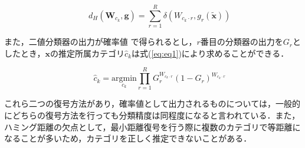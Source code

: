 \begin{description}
\begin{equation}
\label{eq:eq20}
 \hspace{20pt}d_H(\bm{W}_{c_k},\bm{g}) =\sum_{r=1}^R{\delta(W_{c_k\cdot r} , g_r(\tilde{\bm{x}}))}
\end{equation}\par


また，二値分類器の出力が確率値\cite{rvm} で得られるとし，$r$番目の分類器の出力を$G_r$としたとき，$\bm{x}$の推定所属カテゴリ$\hat{c}_k$は式(\ref{eq:eq1})により求めることができる．

\begin{equation}
\label{eq:eq1}
 \hspace{20pt} \hat{c}_k = \underset{{c_k}}{\text{argmin}} \prod_{r=1}^R G_r^{W_{c_k\cdot r}} (1 - G_r)^{W_{c_k\cdot r}}
\end{equation}\par

これら二つの復号方法があり，確率値として出力されるものについては，一般的にどちらの復号方法を行っても分類精度は同程度になると言われている．また，ハミング距離の欠点として，最小距離復号を行う際に複数のカテゴリで等距離になることが多いため，カテゴリを正しく推定できないことがある．

\end{description}



\newpage















